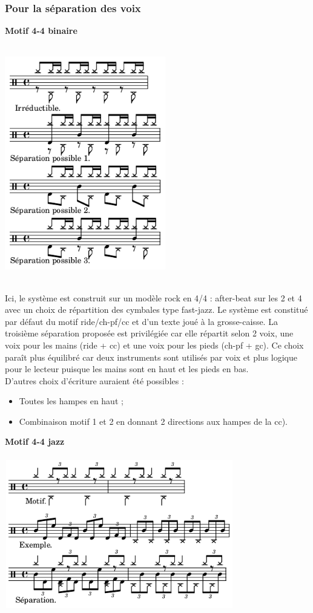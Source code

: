 \subsubsection{Pour la séparation des voix}
\textbf{Motif 4-4 binaire}\\\\
\includegraphics[height=100mm, width=70mm]{z_images/1_description_notation/separation/separation_0.png}\\\\
Ici, le système est construit sur un modèle rock en 4/4 : after-beat sur les 2 et 4 avec un choix de répartition des cymbales type fast-jazz. Le système est constitué par défaut du motif ride/ch-pf/cc et d’un texte joué à la grosse-caisse. La troisième séparation proposée est privilégiée car elle répartit selon 2 voix, une voix pour les mains (ride + cc) et une voix pour les pieds (ch-pf + gc). Ce choix paraît plus équilibré car deux instruments sont utilisés par voix et plus logique pour le lecteur puisque les mains sont en haut et les pieds en bas.\\
D’autres choix d’écriture auraient été possibles :
\begin{itemize}
	\item Toutes les hampes en haut ;
	\item Combinaison motif 1 et 2 en donnant 2 directions aux hampes de la cc).\\
\end{itemize}
\newpage
\textbf{Motif 4-4 jazz}\\\\
\includegraphics[height=65mm, width=100mm]{z_images/1_description_notation/separation/separation_1.png}\\\\
